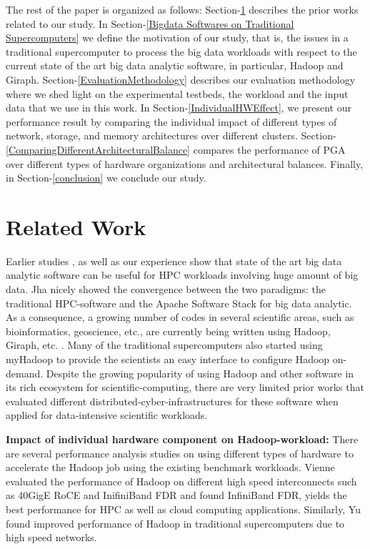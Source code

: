 \documentclass[conference]{IEEEtran}
\begin{document}
The rest of the paper is organized as follows:
Section-\ref{Related Work} describes the prior works related to our study. 
In Section-\ref{Bigdata Softwares on Traditional Supercomputers} we define the motivation of our study, that is, the issues in a traditional supercomputer to process the big data workloads with respect to the current state of the art big data analytic software, in particular, Hadoop and Giraph. Section-\ref{EvaluationMethodology} describes our evaluation methodology where we shed light on the experimental testbeds, the workload and the input data that we use in this work. In Section-\ref{IndividualHWEffect}, we present our performance result by comparing the individual impact of different types of network, storage, and memory architectures over different clusters. Section-\ref{ComparingDifferentArchitecturalBalance} compares the performance of PGA over different types of hardware organizations and architectural balances. Finally, in Section-\ref{conclusion} we conclude our study.

\section {Related Work} \label{Related Work}
Earlier studies \cite{schadoop:fadika} \cite{schadoop:jha}, as well as our experience show that state of the art big data analytic software can be useful for HPC workloads involving huge amount of big data. Jha \cite{schadoop:jha} nicely showed the convergence between the two paradigms: the traditional HPC-software and the Apache Software Stack for big data analytic. As a consequence, a growing number of codes in several scientific areas, such as bioinformatics, geoscience, etc., are currently being written using Hadoop, Giraph, etc. \cite{fw:myhadoop}. Many of the traditional supercomputers also started using myHadoop \cite{fw:myhadoop} to provide the scientists an easy interface to configure Hadoop on-demand. Despite the growing popularity of using Hadoop and other software in its rich ecosystem for scientific-computing, there are very limited prior works that evaluated different distributed-cyber-infrastructures for these software when applied for data-intensive scientific workloads.

\textbf{Impact of individual hardware component on Hadoop-workload:}
There are several performance analysis studies on using different types of hardware to accelerate the Hadoop job using the existing benchmark workloads. Vienne \cite{ethib:vienne} evaluated the performance of Hadoop on different high speed interconnects such as 40GigE RoCE and InifiniBand FDR and found InfiniBand FDR, yields the best performance for HPC as well as cloud computing applications. Similarly, Yu \cite{ethib:yu} found improved performance of Hadoop in traditional supercomputers due to high speed networks.
\end{document}
